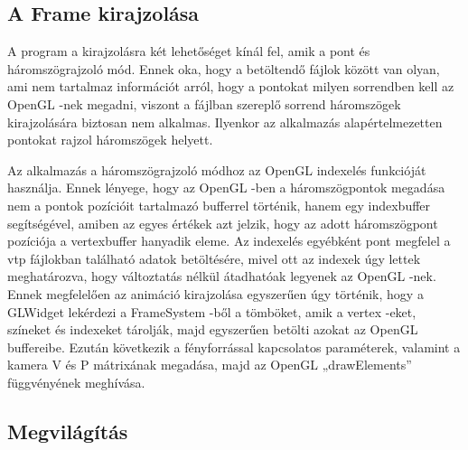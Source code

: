 \subsection{A Frame kirajzolása}

A program a kirajzolásra két lehetőséget kínál fel, 
amik a pont és háromszögrajzoló mód. 
Ennek oka, hogy a betöltendő fájlok között van olyan, 
ami nem tartalmaz információt arról, 
hogy a pontokat milyen sorrendben kell az OpenGL -nek megadni, 
viszont a fájlban szereplő sorrend
háromszögek kirajzolására biztosan nem alkalmas. 
Ilyenkor az alkalmazás alapértelmezetten
pontokat rajzol háromszögek helyett.

Az alkalmazás a háromszögrajzoló módhoz az OpenGL indexelés funkcióját használja. 
Ennek lényege, hogy az OpenGL -ben 
a háromszögpontok megadása nem a pontok pozícióit tartalmazó bufferrel történik, 
hanem egy indexbuffer segítségével, 
amiben az egyes értékek azt jelzik, 
hogy az adott háromszögpont pozíciója a vertexbuffer hanyadik eleme. 
Az indexelés egyébként pont megfelel a vtp fájlokban található adatok betöltésére, 
mivel ott az indexek úgy lettek meghatározva, 
hogy változtatás nélkül átadhatóak legyenek az OpenGL -nek. 
Ennek megfelelően az animáció kirajzolása egyszerűen úgy történik, 
hogy a {\ttfamily GLWidget} lekérdezi 
a {\ttfamily FrameSystem} -ből a tömböket, 
amik a vertex -eket, színeket és indexeket tárolják, 
majd egyszerűen betölti azokat az OpenGL buffereibe. 
Ezután következik a fényforrással kapcsolatos paraméterek, 
valamint a kamera V és P mátrixának megadása, 
majd az OpenGL {\ttfamily „drawElements”} függvényének meghívása.

\subsection{Megvilágítás}

